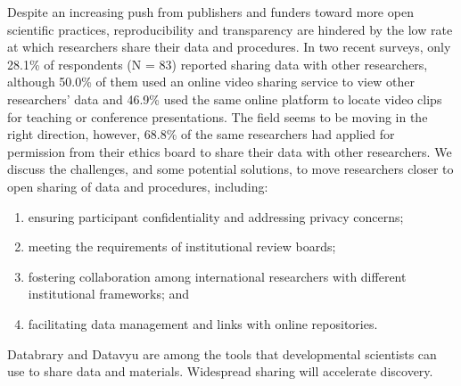 \documentclass[landscape,final,paperwidth=75in,paperheight=48in,fontscale=0.285]{baposter}
\begin{document}
\begin{poster}
%
{
    \par Despite an increasing push from publishers and funders toward more open scientific practices, reproducibility and transparency are hindered by the low rate at which researchers share their data and procedures. In two recent surveys, only 28.1\% of respondents (N = 83) reported sharing data with other researchers, although 50.0\% of them used an online video sharing service to view other researchers' data and 46.9\% used the same online platform to locate video clips for teaching or conference presentations. The field seems to be moving in the right direction, however, 68.8\% of the same researchers had applied for permission from their ethics board to share their data with other researchers. We discuss the challenges, and some potential solutions, to move researchers closer to open sharing of data and procedures, including: 
    \begin{enumerate}
        \item ensuring participant confidentiality and addressing privacy concerns;
        \vspace{-.5em}
        \item meeting the requirements of institutional review boards;
        \vspace{-.5em}
        \item fostering collaboration among international researchers with different institutional frameworks; and 
        \vspace{-.5em}
        \item facilitating data management and links with online repositories. 
    \end{enumerate}
    Databrary and Datavyu are among the tools that developmental scientists can use to share data and materials. Widespread sharing will accelerate discovery.   
}
\end{poster}
\end{document}
